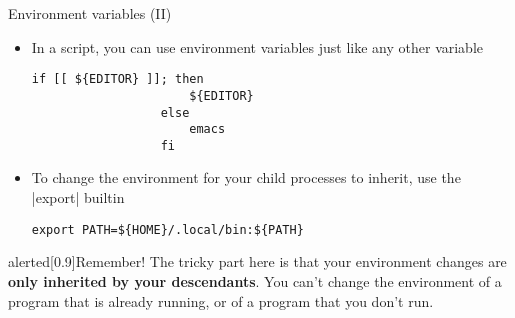\begin{frame}[fragile]{Environment variables (II)}
    \vspace{-3mm}
    \begin{itemize}
        \item In a script, you can use environment variables just like any other variable
              \begin{lstlisting}[style=MyBash, numbers=none, aboveskip=2mm, belowskip=-4mm, xrightmargin=30mm]
                  if [[ ${EDITOR} ]]; then
                      ${EDITOR}
                  else
                      emacs
                  fi
              \end{lstlisting}
        \item To change the environment \alert{for your child processes} to inherit, use the \bash|export| builtin
              \begin{lstlisting}[style=MyBash, numbers=none, aboveskip=2mm, xrightmargin=30mm]
                  export PATH=${HOME}/.local/bin:${PATH}
              \end{lstlisting}
    \end{itemize}
    \begin{varblock}{alerted}[0.9\textwidth]{Remember!}
        The tricky part here is that your environment changes are \alert{\textbf{only inherited by your descendants}}.
        You can't change the environment of a program that is already running, or of a program that you don't run.
    \end{varblock}
\end{frame}
